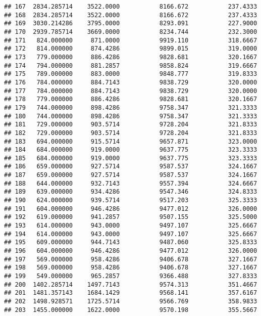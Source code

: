 \documentclass[]{article}
\begin{document}
\begin{verbatim}
## 167  2834.285714    3522.0000           8166.672           237.4333
## 168  2834.285714    3522.0000           8166.672           237.4333
## 169  3030.214286    3795.0000           8293.091           227.9000
## 170  2939.785714    3669.0000           8234.744           232.3000
## 171   824.000000     871.0000           9919.110           318.6667
## 172   814.000000     874.4286           9899.015           319.0000
## 173   779.000000     886.4286           9828.681           320.1667
## 174   794.000000     881.2857           9858.824           319.6667
## 175   789.000000     883.0000           9848.777           319.8333
## 176   784.000000     884.7143           9838.729           320.0000
## 177   784.000000     884.7143           9838.729           320.0000
## 178   779.000000     886.4286           9828.681           320.1667
## 179   744.000000     898.4286           9758.347           321.3333
## 180   744.000000     898.4286           9758.347           321.3333
## 181   729.000000     903.5714           9728.204           321.8333
## 182   729.000000     903.5714           9728.204           321.8333
## 183   694.000000     915.5714           9657.871           323.0000
## 184   684.000000     919.0000           9637.775           323.3333
## 185   684.000000     919.0000           9637.775           323.3333
## 186   659.000000     927.5714           9587.537           324.1667
## 187   659.000000     927.5714           9587.537           324.1667
## 188   644.000000     932.7143           9557.394           324.6667
## 189   639.000000     934.4286           9547.346           324.8333
## 190   624.000000     939.5714           9517.203           325.3333
## 191   604.000000     946.4286           9477.012           326.0000
## 192   619.000000     941.2857           9507.155           325.5000
## 193   614.000000     943.0000           9497.107           325.6667
## 194   614.000000     943.0000           9497.107           325.6667
## 195   609.000000     944.7143           9487.060           325.8333
## 196   604.000000     946.4286           9477.012           326.0000
## 197   569.000000     958.4286           9406.678           327.1667
## 198   569.000000     958.4286           9406.678           327.1667
## 199   549.000000     965.2857           9366.488           327.8333
## 200  1402.285714    1497.7143           9574.313           351.4667
## 201  1481.357143    1684.1429           9568.141           357.6167
## 202  1498.928571    1725.5714           9566.769           358.9833
## 203  1455.000000    1622.0000           9570.198           355.5667

\end{verbatim}
\end{document}
